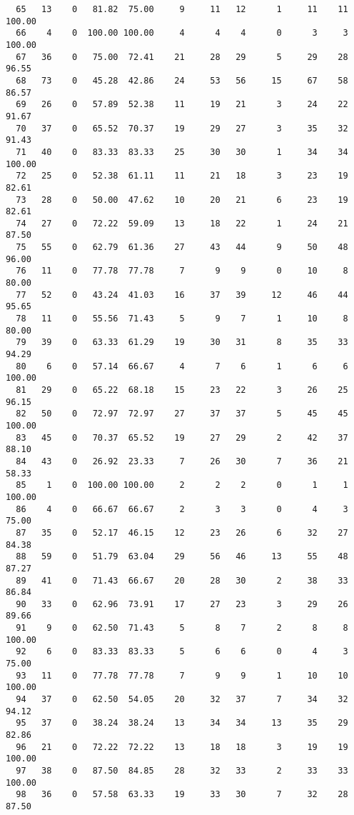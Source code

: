 \begin{verbatim}
  65   13    0   81.82  75.00     9     11   12      1     11    11   100.00
  66    4    0  100.00 100.00     4      4    4      0      3     3   100.00
  67   36    0   75.00  72.41    21     28   29      5     29    28    96.55
  68   73    0   45.28  42.86    24     53   56     15     67    58    86.57
  69   26    0   57.89  52.38    11     19   21      3     24    22    91.67
  70   37    0   65.52  70.37    19     29   27      3     35    32    91.43
  71   40    0   83.33  83.33    25     30   30      1     34    34   100.00
  72   25    0   52.38  61.11    11     21   18      3     23    19    82.61
  73   28    0   50.00  47.62    10     20   21      6     23    19    82.61
  74   27    0   72.22  59.09    13     18   22      1     24    21    87.50
  75   55    0   62.79  61.36    27     43   44      9     50    48    96.00
  76   11    0   77.78  77.78     7      9    9      0     10     8    80.00
  77   52    0   43.24  41.03    16     37   39     12     46    44    95.65
  78   11    0   55.56  71.43     5      9    7      1     10     8    80.00
  79   39    0   63.33  61.29    19     30   31      8     35    33    94.29
  80    6    0   57.14  66.67     4      7    6      1      6     6   100.00
  81   29    0   65.22  68.18    15     23   22      3     26    25    96.15
  82   50    0   72.97  72.97    27     37   37      5     45    45   100.00
  83   45    0   70.37  65.52    19     27   29      2     42    37    88.10
  84   43    0   26.92  23.33     7     26   30      7     36    21    58.33
  85    1    0  100.00 100.00     2      2    2      0      1     1   100.00
  86    4    0   66.67  66.67     2      3    3      0      4     3    75.00
  87   35    0   52.17  46.15    12     23   26      6     32    27    84.38
  88   59    0   51.79  63.04    29     56   46     13     55    48    87.27
  89   41    0   71.43  66.67    20     28   30      2     38    33    86.84
  90   33    0   62.96  73.91    17     27   23      3     29    26    89.66
  91    9    0   62.50  71.43     5      8    7      2      8     8   100.00
  92    6    0   83.33  83.33     5      6    6      0      4     3    75.00
  93   11    0   77.78  77.78     7      9    9      1     10    10   100.00
  94   37    0   62.50  54.05    20     32   37      7     34    32    94.12
  95   37    0   38.24  38.24    13     34   34     13     35    29    82.86
  96   21    0   72.22  72.22    13     18   18      3     19    19   100.00
  97   38    0   87.50  84.85    28     32   33      2     33    33   100.00
  98   36    0   57.58  63.33    19     33   30      7     32    28    87.50

\end{verbatim}
